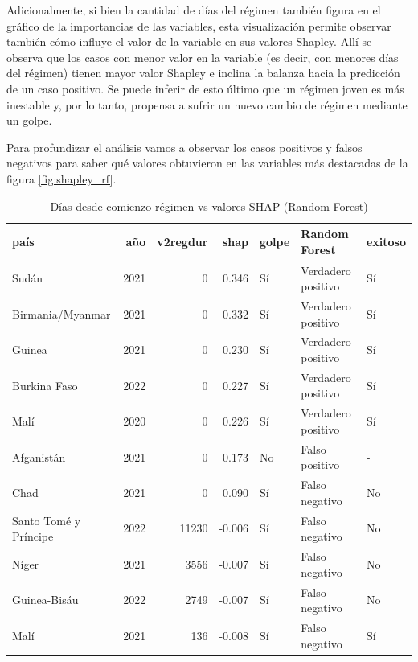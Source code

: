 \documentclass{article}
\begin{document}
Adicionalmente, si bien la cantidad de días del régimen también figura en el gráfico de la 
importancias de las variables, esta visualización permite observar también cómo influye el valor
de la variable en sus valores Shapley. Allí se observa que los casos con menor valor en la variable 
(es decir, con menores días del régimen) tienen mayor valor Shapley e inclina la balanza hacia la 
predicción de un caso positivo. Se puede inferir de esto último que un régimen joven es más 
inestable y, por lo tanto, propensa a sufrir un nuevo cambio de régimen mediante un golpe.

Para profundizar el análisis vamos a observar los casos positivos y falsos negativos para
saber qué valores obtuvieron en las variables más destacadas de la figura \ref{fig:shapley_rf}.

\begin{table}[H]
 \centering

 \begin{tabular}{lrrrlll}
  \toprule
  país & año & v2regdur & shap & golpe & Random Forest & exitoso \\
  \midrule
  Sudán & 2021 & 0 & 0.346 & Sí & Verdadero positivo & Sí \\
  Birmania/Myanmar & 2021 & 0 & 0.332 & Sí & Verdadero positivo & Sí \\
  Guinea & 2021 & 0 & 0.230 & Sí & Verdadero positivo & Sí \\
  Burkina Faso & 2022 & 0 & 0.227 & Sí & Verdadero positivo & Sí \\
  Malí & 2020 & 0 & 0.226 & Sí & Verdadero positivo & Sí \\
  Afganistán & 2021 & 0 & 0.173 & No & Falso positivo & - \\
  Chad & 2021 & 0 & 0.090 & Sí & Falso negativo & No \\
  Santo Tomé y Príncipe & 2022 & 11230 & -0.006 & Sí & Falso negativo & No \\
  Níger & 2021 & 3556 & -0.007 & Sí & Falso negativo & No \\
  Guinea-Bisáu & 2022 & 2749 & -0.007 & Sí & Falso negativo & No \\
  Malí & 2021 & 136 & -0.008 & Sí & Falso negativo & Sí \\
  \bottomrule
  \end{tabular} 
 \caption{Días desde comienzo régimen vs valores SHAP (Random Forest) \label{tab:shap_rf_regdur}}
\end{table}
\end{document}
